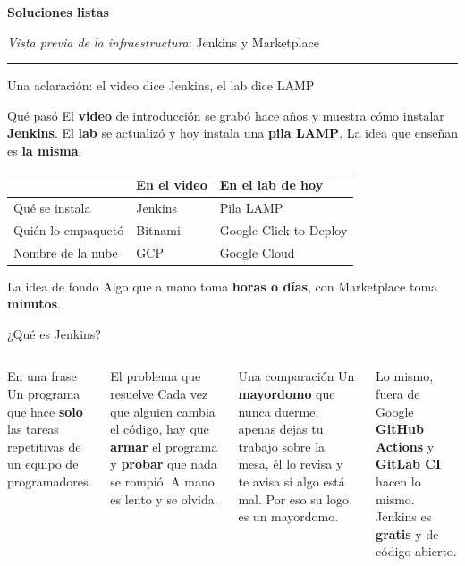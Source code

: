 \documentclass[aspectratio=169,10pt,c]{beamer}
\newcommand{\separador}[2]{%
\begin{frame}[plain]
\vfill
\begin{center}
{\fontsize{29}{34}\selectfont\bfseries #1}\par
\vspace{2mm}
{\small #2}\par
\vspace{4mm}
{\color{utpRojo}\rule{8.5cm}{1.2pt}}
\end{center}
\vfill
\end{frame}}
\begin{document}
\separador{Soluciones listas}{\emph{Vista previa de la infraestructura}: Jenkins y Marketplace}

\begin{frame}{Una aclaración: el video dice Jenkins, el lab dice LAMP}
\begin{block}{Qué pasó}
\small El \textbf{video} de introducción se grabó hace años y muestra cómo instalar \textbf{Jenkins}. El \textbf{lab} se actualizó y hoy instala una \textbf{pila LAMP}. La idea que enseñan es \textbf{la misma}.
\end{block}
\renewcommand{\arraystretch}{1.3}
\centering\small
\begin{tabular}{@{}p{3.4cm}p{4.6cm}p{4.6cm}@{}}
\toprule
 & \textbf{En el video} & \textbf{En el lab de hoy}\\
\midrule
Qué se instala & Jenkins & Pila LAMP\\
Quién lo empaquetó & Bitnami & Google Click to Deploy\\
Nombre de la nube & GCP & Google Cloud\\
\bottomrule
\end{tabular}
\par\vspace{3mm}
\begin{exampleblock}{La idea de fondo}
\small Algo que a mano toma \textbf{horas o días}, con Marketplace toma \textbf{minutos}.
\end{exampleblock}
\end{frame}

\begin{frame}{¿Qué es Jenkins?}
\begin{columns}[T,onlytextwidth]
\begin{block}{En una frase}
\small Un programa que hace \textbf{solo} las tareas repetitivas de un equipo de programadores.
\end{block}
\begin{block}{El problema que resuelve}
\small Cada vez que alguien cambia el código, hay que \textbf{armar} el programa y \textbf{probar} que nada se rompió. A mano es lento y se olvida.
\end{block}
\begin{exampleblock}{Una comparación}
\small Un \textbf{mayordomo} que nunca duerme: apenas dejas tu trabajo sobre la mesa, él lo revisa y te avisa si algo está mal. Por eso su logo es un mayordomo.
\end{exampleblock}
\begin{alertblock}{Lo mismo, fuera de Google}
\small \textbf{GitHub Actions} y \textbf{GitLab CI} hacen lo mismo. Jenkins es \textbf{gratis} y de código abierto.
\end{alertblock}
\end{columns}
\end{frame}
\end{document}
